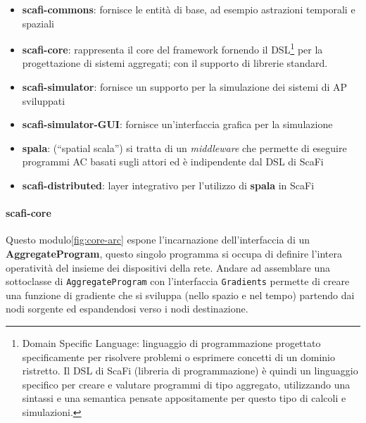 \documentclass[12pt,a4paper,openright,twoside]{book}
\begin{document}
\begin{itemize}
    \item \textbf{scafi-commons}: fornisce le entità di base, ad esempio astrazioni temporali e spaziali
    \item \textbf{scafi-core}: rappresenta il core del framework fornendo il DSL\footnote{Domain Specific Language: linguaggio di programmazione progettato specificamente per risolvere problemi o esprimere concetti di un dominio ristretto. Il DSL di ScaFi (libreria di programmazione) è quindi un linguaggio specifico per creare e valutare programmi di tipo aggregato, utilizzando una sintassi e una semantica pensate appositamente per questo tipo di calcoli e simulazioni.} per la progettazione di sistemi aggregati; con il supporto di librerie standard.
    \item \textbf{scafi-simulator}: fornisce un supporto per la simulazione dei sistemi di \ac{AP} sviluppati
    \item \textbf{scafi-simulator-GUI}: fornisce un'interfaccia grafica per la simulazione
    \item \textbf{spala}: (``spatial scala'') si tratta di un \textit{middleware} che permette di eseguire programmi \ac{AC} basati sugli attori ed è indipendente dal DSL di ScaFi
    \item \textbf{scafi-distributed}: layer integrativo per l'utilizzo di \textbf{spala} in ScaFi
\end{itemize}

\paragraph{scafi-core} Questo modulo\cref{fig:core-arc} espone l'incarnazione dell'interfaccia di un \textbf{AggregateProgram}, questo singolo programma si occupa di definire l'intera operatività del insieme dei dispositivi della rete. Andare ad assemblare una sottoclasse di \verb|AggregateProgram| con l'interfaccia \verb|Gradients| permette di creare una funzione di gradiente che si sviluppa (nello spazio e nel tempo) partendo dai nodi sorgente ed espandendosi verso i nodi destinazione.
\end{document}
